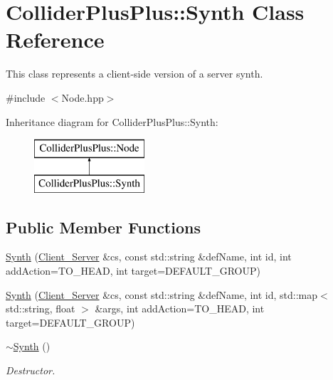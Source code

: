 \hypertarget{classColliderPlusPlus_1_1Synth}{\section{Collider\-Plus\-Plus\-:\-:Synth Class Reference}
\label{classColliderPlusPlus_1_1Synth}
}


This class represents a client-\/side version of a server synth.  




{\ttfamily \#include $<$Node.\-hpp$>$}

Inheritance diagram for Collider\-Plus\-Plus\-:\-:Synth\-:\begin{figure}[H]
\begin{center}
\leavevmode
\includegraphics[height=2.000000cm]{classColliderPlusPlus_1_1Synth}
\end{center}
\end{figure}
\subsection*{Public Member Functions}
\begin{DoxyCompactItemize}
\item 
\hyperlink{classColliderPlusPlus_1_1Synth_ac3f806d2e0109543b2e511a7b5b2fe79}{Synth} (\hyperlink{classColliderPlusPlus_1_1Client__Server}{Client\-\_\-\-Server} \&cs, const std\-::string \&def\-Name, int id, int add\-Action=T\-O\-\_\-\-H\-E\-A\-D, int target=D\-E\-F\-A\-U\-L\-T\-\_\-\-G\-R\-O\-U\-P)
\item 
\hyperlink{classColliderPlusPlus_1_1Synth_adf2410b3751b1aac52f3c8245f93f822}{Synth} (\hyperlink{classColliderPlusPlus_1_1Client__Server}{Client\-\_\-\-Server} \&cs, const std\-::string \&def\-Name, int id, std\-::map$<$ std\-::string, float $>$ \&args, int add\-Action=T\-O\-\_\-\-H\-E\-A\-D, int target=D\-E\-F\-A\-U\-L\-T\-\_\-\-G\-R\-O\-U\-P)
\item 
\hypertarget{classColliderPlusPlus_1_1Synth_a499506ce3ce3335a7885a81d21630da2}{\hyperlink{classColliderPlusPlus_1_1Synth_a499506ce3ce3335a7885a81d21630da2}{$\sim$\-Synth} ()}\label{classColliderPlusPlus_1_1Synth_a499506ce3ce3335a7885a81d21630da2}

\begin{DoxyCompactList}\small\item\em Destructor. \end{DoxyCompactList}\end{DoxyCompactItemize}
